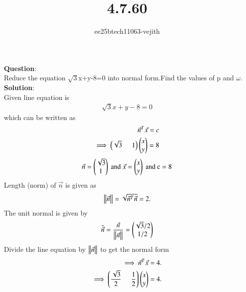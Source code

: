 \documentclass[journal]{IEEEtran}
\begin{document}

\vspace{3cm}

\title{4.7.60}
\author{ee25btech11063-vejith}

\maketitle
{\let\newpage\relax\maketitle}
\renewcommand{\thefigure}{\theenumi}
\renewcommand{\thetable}{\theenumi}
\setlength{\intextsep}{10pt} %
\textbf{Question}:\\
Reduce the equation $\sqrt{3}$x+y-8=0 into normal form.Find the values of p and $\omega$.\\
\textbf{Solution}:\\
Given line equation is
\begin{align}
    \sqrt{3}x+y-8=0
\end{align} which can be written as 
\begin{align}
    \Vec{n}^T\Vec{x}=c\\
    \implies \left(\sqrt{3}\hspace{0.5cm}1\right)\begin{pmatrix}x\\y\end{pmatrix}=8
\end{align}
\begin{align}
    \Vec{n}=\begin{pmatrix}\sqrt{3}\\1\end{pmatrix} \text{ and } \Vec{x}=\begin{pmatrix}x\\y\end{pmatrix} \text{ and c}=8
\end{align}
Length (norm) of  $\Vec{n}$ is given as
\begin{align}
    \left\lVert\Vec{n}\right\rVert=\sqrt{\Vec{n}^T\Vec{n}}=2.
\end{align}
The unit normal is given by
\begin{align}
    \hat{\Vec{n}}=\frac{\Vec{n}}{\left\lVert\Vec{n}\right\rVert}=\begin{pmatrix}\sqrt{3}/2 \\ 1/2\end{pmatrix}
\end{align}
Divide the line equation by $\left\lVert\Vec{n}\right\rVert$ to get the normal form
\begin{align}
    \implies \Vec{n}^T\Vec{x}=4.\\
    \implies \left(\frac{\sqrt{3}}{2} \hspace{0.5cm} \frac{1}{2}\right)\begin{pmatrix}x\\y\end{pmatrix}=4.
    \end{align}
\end{document}
